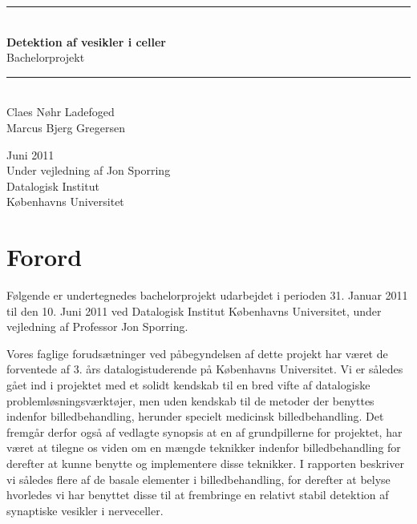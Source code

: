

\pagestyle{empty}
\begin{center} %
\newcommand{\HRule}{\rule{\textwidth}{1mm}}
\vspace*{2cm}\hspace{4cm}%
\HRule\\[1cm]\huge{\textbf{
Detektion af vesikler i celler}}\\[0.7cm]
\huge{Bachelorprojekt}\\[1cm]
\HRule\\[3cm]
\large{Claes Nøhr Ladefoged\\[0.7cm]
       Marcus Bjerg Gregersen\\[0.7cm]}
 \vspace{2cm}
\end{center}
\begin{flushleft}
Juni 2011\\
\vspace{0,5cm}
Under vejledning af Jon Sporring\\
Datalogisk Institut\\
Københavns Universitet
\end{flushleft}
\newpage


\newpage
\pagestyle{plain}
\section*{Forord}
Følgende er undertegnedes bachelorprojekt udarbejdet i perioden 31. Januar 2011 til den 10. Juni 2011 ved Datalogisk Institut Københavns Universitet, under vejledning af Professor Jon Sporring.

Vores faglige forudsætninger ved påbegyndelsen af dette projekt har været de forventede af 3. års datalogistuderende på Københavns Universitet. 
Vi er således gået ind i projektet med et solidt kendskab til en bred vifte af datalogiske problemløsningsværktøjer, men uden kendskab til de metoder der benyttes indenfor billedbehandling, herunder specielt medicinsk billedbehandling.
Det fremgår derfor også af vedlagte synopsis at en af grundpillerne for projektet, har været at tilegne os viden om en mængde teknikker indenfor billedbehandling for derefter at kunne benytte og implementere disse teknikker.
I rapporten beskriver vi således flere af de basale elementer i billedbehandling, for derefter at belyse hvorledes vi har benyttet disse til at frembringe en relativt stabil detektion af synaptiske vesikler i nerveceller.

